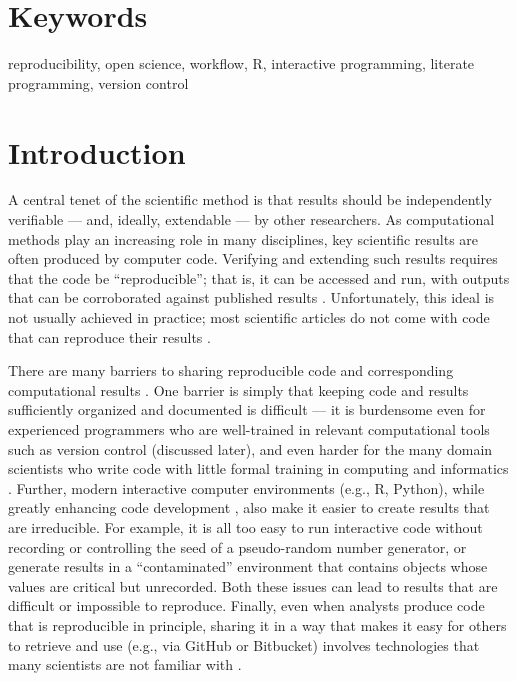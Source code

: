\documentclass[9pt,a4paper]{extarticle}
\begin{document}
\section*{Keywords}

reproducibility, open science, workflow, R, interactive programming,
literate programming, version control

\clearpage

\pagestyle{main}


\section*{Introduction}

A central tenet of the scientific method is that results should be
independently verifiable --- and, ideally, extendable --- by other
researchers. As computational methods play an increasing role in many
disciplines, key scientific results are often produced by computer code.
Verifying and extending such results requires that the code be
``reproducible''; that is, it can be accessed and run, with outputs that
can be corroborated against published results \cite{Buckheit1995,
Gentleman2007, Peng2011, Ince2012, Morin2012, Sandve2013,
Easterbrook2014, Stodden2016, Lowndes2017}. Unfortunately, this ideal is
not usually achieved in practice; most scientific articles do not come
with code that can reproduce their results \cite{Ioannidis2009,
Merali2010, Ioannidis2014, Stodden2018}.

There are many barriers to sharing reproducible code and corresponding
computational results \cite{kitzes2017}. One barrier is simply that
keeping code and results sufficiently organized and documented is
difficult --- it is burdensome even for experienced programmers who are
well-trained in relevant computational tools such as version control
(discussed later), and even harder for the many domain scientists who
write code with little formal training in computing and informatics
\cite{Wilson2014}. Further, modern interactive computer environments
(e.g., R, Python), while greatly enhancing code development
\cite{Findler2002}, also make it easier to create results that are
irreducible. For example, it is all too easy to run interactive code
without recording or controlling the seed of a pseudo-random number
generator, or generate results in a ``contaminated'' environment that
contains objects whose values are critical but unrecorded. Both these
issues can lead to results that are difficult or impossible to
reproduce. Finally, even when analysts produce code that is reproducible
in principle, sharing it in a way that makes it easy for others to
retrieve and use (e.g., via GitHub or Bitbucket) involves technologies
that many scientists are not familiar with \cite{Marwick2017,
Stodden2018}.
\end{document}
